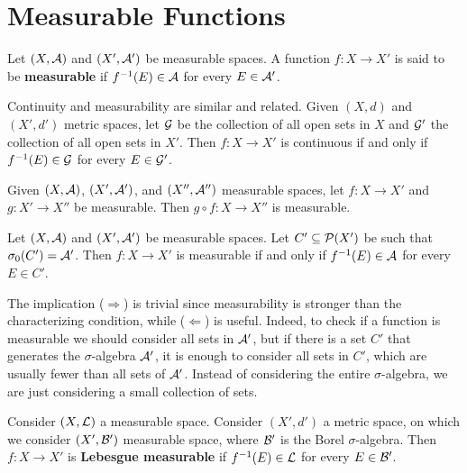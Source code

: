 \section{Measurable Functions}

\begin{definition}
Let $(X,\mathcal{A})$ and $(X',\mathcal{A}')$ be measurable spaces.
A function $f:X \to X'$ is said to be \textbf{measurable} if $f^{-1}(E) \in \mathcal{A}$ for every $E \in \mathcal{A}'$.
\end{definition}

\begin{remark}
Continuity and measurability are similar and related.
Given $(X,d)$ and $(X',d')$ metric spaces, let $\mathcal{G}$ be the collection of all open sets in $X$ and $\mathcal{G}'$ the collection of all open sets in $X'$.
Then $f:X \to X'$ is continuous if and only if $f^{-1}(E) \in \mathcal{G}$ for every $E \in \mathcal{G}'$.
\end{remark}

\begin{proposition}
Given $(X,\mathcal{A})$, $(X',\mathcal{A}')$, and $(X'',\mathcal{A}'')$ measurable spaces, let $f:X \to X'$ and $g:X' \to X''$ be measurable.
Then $g \circ f:X \to X''$ is measurable.
\end{proposition}

\begin{theorem} 
Let $(X,\mathcal{A})$ and $(X',\mathcal{A}')$ be measurable spaces.
Let $C' \subseteq \mathcal{P}(X')$ be such that $\sigma_0(C') = \mathcal{A}'$.
Then $f:X \to X'$ is measurable if and only if $f^{-1}(E) \in \mathcal{A}$ for every $E \in C'$.
\end{theorem}

\begin{remark}
The implication ($\Rightarrow$) is trivial since measurability is stronger than the characterizing condition, while ($\Leftarrow$) is useful.
Indeed, to check if a function is measurable we should consider all sets in $\mathcal{A}'$, but if there is a set $C'$ that generates the $\sigma$-algebra $\mathcal{A}'$, it is enough to consider all sets in $C'$, which are usually fewer than all sets of $\mathcal{A}'$.
Instead of considering the entire $\sigma$-algebra, we are just considering a small collection of sets.
\end{remark}

\begin{definition}
Consider $(X,\mathcal{L})$ a measurable space.
Consider $(X',d')$ a metric space, on which we consider $(X',\mathcal{B}')$ measurable space, where $\mathcal{B}'$ is the Borel $\sigma$-algebra.
Then $f:X \to X'$ is \textbf{Lebesgue measurable} if $f^{-1}(E) \in \mathcal{L}$ for every $E \in \mathcal{B}'$.
\end{definition}


